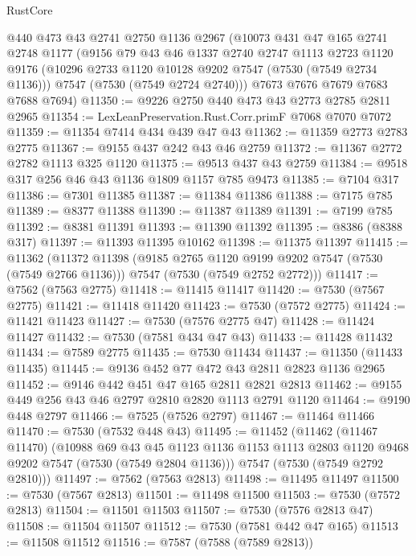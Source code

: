 \begin{lexlean}{RustCore}
\begin{coremodule}
    @440
    @473
    @43
    @2741
    @2750
    @1136
    @2967
    (@10073
      @431
      @47
      @165
      @2741
      @2748
      @1177
      (@9156
        @79
        @43
        @46
        @1337
        @2740
        @2747
        @1113
        @2723
        @1120
        @9176
        (@10296 @2733 @1120 @10128 @9202 @7547 (@7530 (@7549 @2734 @1136)))
        @7547
        (@7530 (@7549 @2724 @2740)))
      @7673
      @7676
      @7679
      @7683
      @7688
      @7694)
@11350 := @9226 @2750 @440 @473 @43 @2773 @2785 @2811 @2965
@11354 := LexLeanPreservation.Rust.Corr.primF @7068 @7070 @7072
@11359 := @11354 @7414 @434 @439 @47 @43
@11362 := @11359 @2773 @2783 @2775
@11367 := @9155 @437 @242 @43 @46 @2759
@11372 := @11367 @2772 @2782 @1113 @325 @1120
@11375 := @9513 @437 @43 @2759
@11384 := @9518 @317 @256 @46 @43 @1136 @1809 @1157 @785 @9473
@11385 := @7104 @317
@11386 := @7301 @11385
@11387 := @11384 @11386
@11388 := @7175 @785
@11389 := @8377 @11388
@11390 := @11387 @11389
@11391 := @7199 @785
@11392 := @8381 @11391
@11393 := @11390 @11392
@11395 := @8386 (@8388 @317)
@11397 := @11393 @11395 @10162
@11398 := @11375 @11397
@11415 := @11362
    (@11372
      @11398
      (@9185 @2765 @1120 @9199 @9202 @7547 (@7530 (@7549 @2766 @1136)))
      @7547
      (@7530 (@7549 @2752 @2772)))
@11417 := @7562 (@7563 @2775)
@11418 := @11415 @11417
@11420 := @7530 (@7567 @2775)
@11421 := @11418 @11420
@11423 := @7530 (@7572 @2775)
@11424 := @11421 @11423
@11427 := @7530 (@7576 @2775 @47)
@11428 := @11424 @11427
@11432 := @7530 (@7581 @434 @47 @43)
@11433 := @11428 @11432
@11434 := @7589 @2775
@11435 := @7530 @11434
@11437 := @11350 (@11433 @11435)
@11445 := @9136 @452 @77 @472 @43 @2811 @2823 @1136 @2965
@11452 := @9146 @442 @451 @47 @165 @2811 @2821 @2813
@11462 := @9155 @449 @256 @43 @46 @2797 @2810 @2820 @1113 @2791 @1120
@11464 := @9190 @448 @2797
@11466 := @7525 (@7526 @2797)
@11467 := @11464 @11466
@11470 := @7530 (@7532 @448 @43)
@11495 := @11452
    (@11462
      (@11467 @11470)
      (@10988
        @69
        @43
        @45
        @1123
        @1136
        @1153
        @1113
        @2803
        @1120
        @9468
        @9202
        @7547
        (@7530 (@7549 @2804 @1136)))
      @7547
      (@7530 (@7549 @2792 @2810)))
@11497 := @7562 (@7563 @2813)
@11498 := @11495 @11497
@11500 := @7530 (@7567 @2813)
@11501 := @11498 @11500
@11503 := @7530 (@7572 @2813)
@11504 := @11501 @11503
@11507 := @7530 (@7576 @2813 @47)
@11508 := @11504 @11507
@11512 := @7530 (@7581 @442 @47 @165)
@11513 := @11508 @11512
@11516 := @7587 (@7588 (@7589 @2813))

\end{coremodule}
\end{lexlean}
